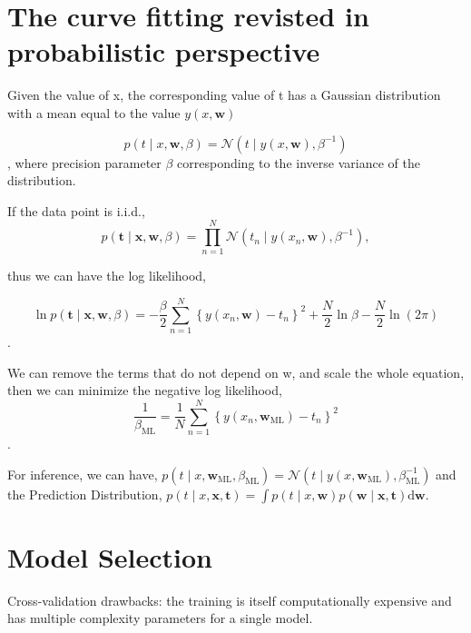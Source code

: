 \documentclass{article}
\begin{document}
\section{The curve fitting revisted in probabilistic perspective}
Given the value of x, the corresponding value of t has a Gaussian distribution with a mean equal to the value $y(x, \mathbf{w})$

$$p(t \mid x, \mathbf{w}, \beta)=\mathcal{N}\left(t \mid y(x, \mathbf{w}), \beta^{-1}\right)$$,
where precision parameter $\beta$ corresponding to the inverse variance of the distribution.

If the data point is i.i.d.,
$$p(\mathbf{t} \mid \mathbf{x}, \mathbf{w}, \beta)=\prod_{n=1}^{N} \mathcal{N}\left(t_{n} \mid y\left(x_{n}, \mathbf{w}\right), \beta^{-1}\right),$$

thus we can have the log likelihood,

$$\ln p(\mathbf{t} \mid \mathbf{x}, \mathbf{w}, \beta)=-\frac{\beta}{2} \sum_{n=1}^{N}\left\{y\left(x_{n}, \mathbf{w}\right)-t_{n}\right\}^{2}+\frac{N}{2} \ln \beta-\frac{N}{2} \ln (2 \pi)$$.

We can remove the terms that do not depend on w, and scale the whole equation, then we can minimize the negative log likelihood,
$$\frac{1}{\beta_{\mathrm{ML}}}=\frac{1}{N} \sum_{n=1}^{N}\left\{y\left(x_{n}, \mathbf{w}_{\mathrm{ML}}\right)-t_{n}\right\}^{2}$$.

For inference, we can have,
$
p\left(t \mid x, \mathbf{w}_{\mathrm{ML}}, \beta_{\mathrm{ML}}\right)=\mathcal{N}\left(t \mid y\left(x, \mathbf{w}_{\mathrm{ML}}\right), \beta_{\mathrm{ML}}^{-1}\right)
$
and the Prediction Distribution, 
$
p(t \mid x, \mathbf{x}, \mathbf{t})=\int p(t \mid x, \mathbf{w}) p(\mathbf{w} \mid \mathbf{x}, \mathbf{t}) \mathrm{d} \mathbf{w}
$.

\section{Model Selection}
Cross-validation drawbacks: the training is itself computationally expensive and has multiple complexity parameters for a single model.
\end{document}
